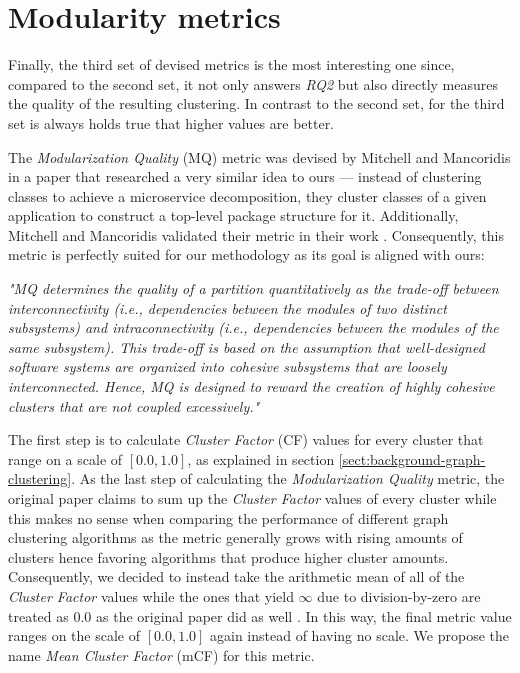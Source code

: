 \documentclass[12pt,a4paper]{report}
\begin{document}
\section{Modularity metrics}

Finally, the third set of devised metrics is the most interesting one since,
compared to the second set, it not only answers \textit{RQ2} but also directly
measures the quality of the resulting clustering.
In contrast to the second set, for the third set is always holds true that
higher values are better.

The \textit{Modularization Quality} (MQ) metric was devised by Mitchell and Mancoridis
\cite{mitchell2006automatic} in a paper that researched a very similar idea to ours ---
instead of clustering classes to achieve a microservice decomposition, they cluster
classes of a given application to construct a top\hyp level package structure for it.
Additionally, Mitchell and Mancoridis validated their metric in their work
\cite{mitchell2006automatic}.
Consequently, this metric is perfectly suited for our methodology as its goal is aligned with ours:
\begin{displayquote}
\emph{"MQ determines the quality of a partition quantitatively as the trade-off
between interconnectivity (i.e., dependencies between the modules of two distinct
subsystems) and intraconnectivity (i.e., dependencies between the modules of
the same subsystem). This trade-off is based on the assumption that well-designed
software systems are organized into cohesive subsystems that are loosely interconnected.
Hence, MQ is designed to reward the creation of highly cohesive clusters that
are not coupled excessively."}~\cite{mitchell2006automatic}
\end{displayquote}

The first step is to calculate \textit{Cluster Factor} (CF) values for every cluster
that range on a scale of \([0.0, 1.0]\), as explained in section
\ref{sect:background-graph-clustering}.
As the last step of calculating the \textit{Modularization Quality} metric,
the original paper claims to sum up the \textit{Cluster Factor}
values of every cluster while this makes no sense when comparing the performance
of different graph clustering algorithms as the metric generally grows with
rising amounts of clusters hence favoring algorithms that produce higher cluster
amounts. Consequently, we decided to instead take the arithmetic mean of all of
the \textit{Cluster Factor} values while the ones that yield $\infty$ due to
division\hyp by\hyp zero are treated as $0.0$ as the original paper did as well
\cite{mitchell2006automatic}. In this way, the final metric value
ranges on the scale of \([0.0, 1.0]\) again instead of having no scale.
We propose the name \textit{Mean Cluster Factor} (mCF) for this metric.
\end{document}
